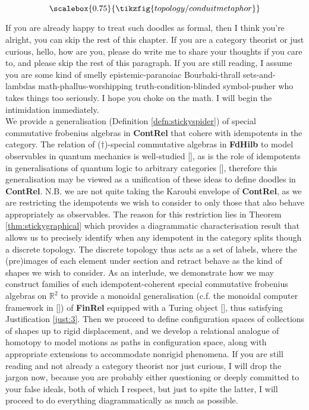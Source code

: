\begin{fullwidth}
\[\scalebox{0.75}{\tikzfig{topology/conduitmetaphor}}\]

If you are already happy to treat such doodles as formal, then I think you're alright, you can skip the rest of this chapter. If you are a category theorist or just curious, hello, how are you, please do write me to share your thoughts if you care to, and please skip the rest of this paragraph. If you are still reading, I assume you are some kind of smelly epistemic-paranoiac Bourbaki-thrall sets-and-lambdas math-phallus-worshipping truth-condition-blinded symbol-pusher who takes things too seriously. I hope you choke on the math. I will begin the intimidation immediately.\\

We provide a generalisation (Definition \ref{defn:stickyspider}) of special commutative frobenius algebras in \textbf{ContRel} that cohere with idempotents in the category. The relation of ($\dagger$)-special commutative algebras in \textbf{FdHilb} to model observables in quantum mechanics is well-studied [], as is the role of idempotents in generalisations of quantum logic to arbitrary categories [], therefore this generalisation may be viewed as a unification of these ideas to define doodles in \textbf{ContRel}. N.B. we are not quite taking the Karoubi envelope of \textbf{ContRel}, as we are restricting the idempotents we wish to consider to only those that also behave appropriately as observables. The reason for this restriction lies in Theorem \ref{thm:stickygraphical} which provides a diagrammatic characterisation result that allows us to precisely identify when any idempotent in the category splits though a discrete topology. The discrete topology thus acts as a set of labels, where the (pre)images of each element under section and retract behave as the kind of shapes we wish to consider. As an interlude, we demonstrate how we may construct families of such idempotent-coherent special commutative frobenius algebras on $\mathbb{R}^2$ to provide a monoidal generalisation (c.f. the monoidal computer framework in []) of \textbf{FinRel} equipped with a Turing object [], thus satisfying Justification \ref{just:3}. Then we proceed to define configuration spaces of collections of shapes up to rigid displacement, and we develop a relational analogue of homotopy to model motions as paths in configuration space, along with appropriate extensions to accommodate nonrigid phenomena. If you are still reading and not already a category theorist nor just curious, I will drop the jargon now, because you are probably either questioning or deeply committed to your false ideals, both of which I respect, but just to spite the latter, I will proceed to do everything diagrammatically as much as possible.


\end{fullwidth}
